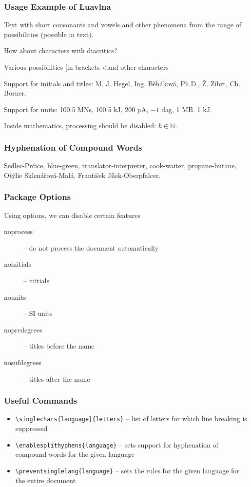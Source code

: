 \begin{frame}
  \frametitle{Usage Example of Luavlna}
  \begin{minipage}{3in}

    \preventsingledebugon

    Text with short consonants and vowels and other phenomena
    from the range of possibilities (possible in text).

    How about characters with diacritics?

    Various possibilities [in brackets \textless and other characters

    Support for initials and titles: M. J. Hegel, Ing. Běháková, Ph.D., Ž. Zíbrt,
    Ch. Borner.

    Support for units: 100.5 MN\cdot{}s, 100.5 kJ, 200 µA, $-1$ dag, 1 MB. 1 kJ.

    Inside mathematics, processing should be disabled: $k \in \mathbb N$.

    \preventsingledebugoff
  \end{minipage}
\end{frame}

\begin{frame}
    \frametitle{Hyphenation of Compound Words}
    \begin{center}
    \begin{minipage}{2in}
      Sedlec-Prčice, blue-green, translator-interpreter, cook-waiter, propane-butane, Otýlie Sklenářová-Malá, František Jílek-Oberpfalcer.
    \end{minipage}
  \end{center}
\end{frame}

\begin{frame}
  \frametitle{Package Options}
  Using options, we can disable certain features
  \begin{description}
    \item [noprocess] – do not process the document automatically
    \item [noinitials] – initials
    \item [nounits] – SI units
    \item [nopredegrees] – titles before the name
    \item [nosufdegrees] – titles after the name
  \end{description}
\end{frame}

\begin{frame}[fragile]
  \frametitle{Useful Commands}
  \begin{itemize}
    \item \verb|\singlechars{language}{letters}| -- list of letters for which line breaking is suppressed
    \item \verb|\enablesplithyphens{language}| -- sets support for hyphenation of compound words for the given language
    \item \verb|\preventsinglelang{language}| -- sets the rules for the given language for the entire document
  \end{itemize}
\end{frame}

